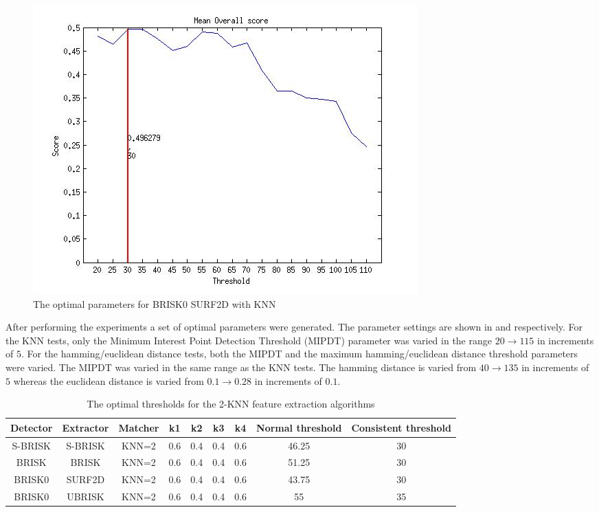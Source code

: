 \documentclass{article}
\begin{document}
\begin{figure}
\begin{minipage}[b]{0.5\linewidth}
\includegraphics[scale=0.5]{../Drawings/OptimalParameters_SBRISK_SURF2D_KNN.jpg}
\caption{The optimal parameters for BRISK0 SURF2D with KNN}
\label{fig:BRISK0surfknnOptimal}
\end{minipage}
\end{figure}

After performing the experiments a set of optimal parameters were generated. The parameter settings are shown in  and  respectively. For the KNN tests, only the Minimum Interest Point Detection Threshold (MIPDT) parameter was varied in the range $20 \rightarrow 115$ in increments of $5$. For the hamming/euclidean distance tests, both the MIPDT and the maximum hamming/euclidean distance threshold parameters were varied. The MIPDT was varied in the same range as the KNN tests. The hamming distance is varied from $40 \rightarrow 135$ in increments of $5$ whereas the euclidean distance is varied from $0.1 \rightarrow 0.28$ in increments of $0.1$. \\



\begin{table}
\caption{The optimal thresholds for the 2-KNN feature extraction algorithms}
\begin{tabular}{|c|c|c|c|c|c|c|c|c|}
\hline 
Detector & Extractor & Matcher & k1 & k2 & k3 & k4 & Normal threshold & Consistent threshold\tabularnewline
\hline 
\hline 
S-BRISK & S-BRISK & KNN=2 & 0.6 & 0.4 & 0.4 & 0.6 & 46.25 & 30\tabularnewline
\hline 
BRISK & BRISK & KNN=2 & 0.6 & 0.4 & 0.4 & 0.6 & 51.25 & 30\tabularnewline
\hline 
BRISK0 & SURF2D & KNN=2 & 0.6 & 0.4 & 0.4 & 0.6 & 43.75 & 30\tabularnewline
\hline 
BRISK0 & UBRISK & KNN=2 & 0.6 & 0.4 & 0.4 & 0.6 & 55 & 35\tabularnewline
\hline 
\end{tabular}
\label{tab:knnStatistics}
\end{table}
\end{document}
